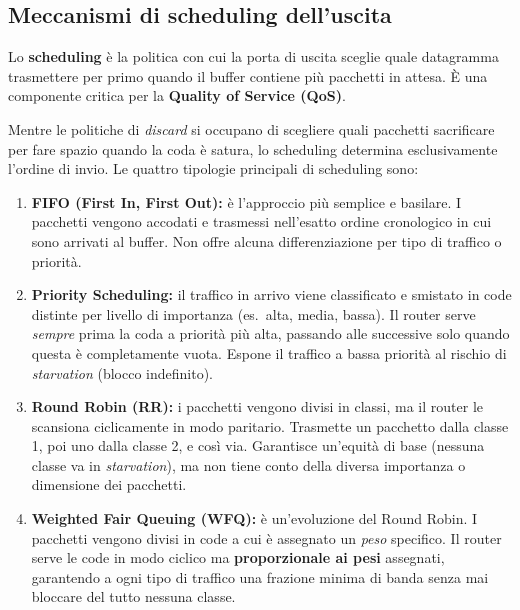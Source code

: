 \documentclass[a4paper,12pt]{report}
\begin{document}
\subsection{Meccanismi di scheduling dell'uscita}
\label{scheduling}
Lo \textbf{scheduling} è la politica con cui la porta di uscita sceglie
quale datagramma trasmettere per primo quando il buffer contiene più
pacchetti in attesa. È una componente critica per la \textbf{Quality of
Service (QoS)}. 

Mentre le politiche di \emph{discard} si occupano di scegliere quali pacchetti sacrificare per fare spazio quando la coda è satura, lo scheduling determina esclusivamente l'ordine di invio. Le quattro tipologie principali di scheduling sono:

\begin{enumerate}
    \item \textbf{FIFO (First In, First Out):} è l'approccio più semplice e basilare. I pacchetti vengono accodati e trasmessi nell'esatto ordine cronologico in cui sono arrivati al buffer. Non offre alcuna differenziazione per tipo di traffico o priorità.
    
    \item \textbf{Priority Scheduling:} il traffico in arrivo viene classificato e smistato in code distinte per livello di importanza (es.\ alta, media, bassa). Il router serve \emph{sempre} prima la coda a priorità più alta, passando alle successive solo quando questa è completamente vuota. Espone il traffico a bassa priorità al rischio di \textit{starvation} (blocco indefinito).
    
    \item \textbf{Round Robin (RR):} i pacchetti vengono divisi in classi, ma il router le scansiona ciclicamente in modo paritario. Trasmette un pacchetto dalla classe 1, poi uno dalla classe 2, e così via. Garantisce un'equità di base (nessuna classe va in \textit{starvation}), ma non tiene conto della diversa importanza o dimensione dei pacchetti.
    
    \item \textbf{Weighted Fair Queuing (WFQ):} è un'evoluzione del Round Robin. I pacchetti vengono divisi in code a cui è assegnato un \emph{peso} specifico. Il router serve le code in modo ciclico ma \textbf{proporzionale ai pesi} assegnati, garantendo a ogni tipo di traffico una frazione minima di banda senza mai bloccare del tutto nessuna classe.

\end{enumerate}
\end{document}
